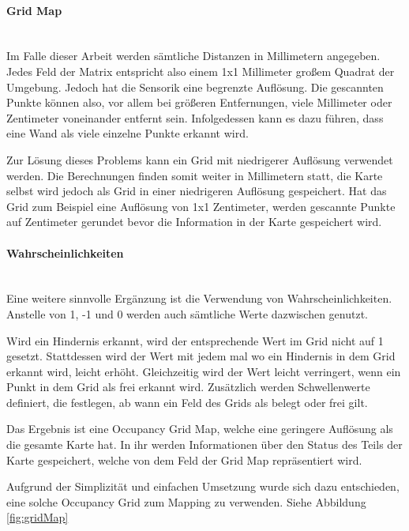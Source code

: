 \paragraph{Grid Map} \mbox{}\\
Im Falle dieser Arbeit werden sämtliche Distanzen in Millimetern angegeben.
Jedes Feld der Matrix entspricht also einem 1x1 Millimeter großem Quadrat der Umgebung.
Jedoch hat die Sensorik eine begrenzte Auflösung.
Die gescannten Punkte können also, vor allem bei größeren Entfernungen, viele Millimeter oder Zentimeter voneinander entfernt sein.
Infolgedessen kann es dazu führen, dass eine Wand als viele einzelne Punkte erkannt wird.

Zur Lösung dieses Problems kann ein Grid mit niedrigerer Auflösung verwendet werden.
Die Berechnungen finden somit weiter in Millimetern statt, die Karte selbst wird jedoch als Grid in einer niedrigeren Auflösung gespeichert.
Hat das Grid zum Beispiel eine Auflösung von 1x1 Zentimeter, werden gescannte Punkte auf Zentimeter gerundet bevor die Information in der Karte gespeichert wird.

\paragraph{Wahrscheinlichkeiten} \mbox{}\\
Eine weitere sinnvolle Ergänzung ist die Verwendung von Wahrscheinlichkeiten.
Anstelle von 1, -1 und 0 werden auch sämtliche Werte dazwischen genutzt.

Wird ein Hindernis erkannt, wird der entsprechende Wert im Grid nicht auf 1 gesetzt.
Stattdessen wird der Wert mit jedem mal wo ein Hindernis in dem Grid erkannt wird, leicht erhöht.
Gleichzeitig wird der Wert leicht verringert, wenn ein Punkt in dem Grid als frei erkannt wird.
Zusätzlich werden Schwellenwerte definiert, die festlegen, ab wann ein Feld des Grids als belegt oder frei gilt.

Das Ergebnis ist eine Occupancy Grid Map, welche eine geringere Auflösung als die gesamte Karte hat.
In ihr werden Informationen über den Status des Teils der Karte gespeichert, welche von dem Feld der Grid Map repräsentiert wird.

Aufgrund der Simplizität und einfachen Umsetzung wurde sich dazu entschieden, eine solche Occupancy Grid zum Mapping zu verwenden.
Siehe Abbildung \ref{fig:gridMap}

